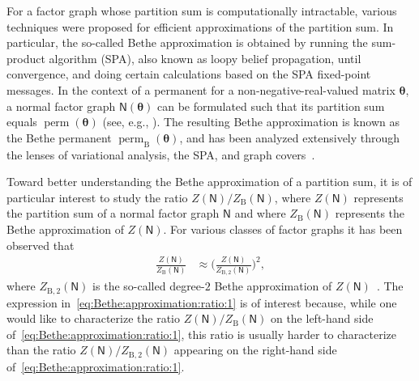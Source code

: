 \documentclass[conference]{IEEEtran}
\theoremstyle{plain}
\theoremstyle{definition}
\newcommand{\B}{\mathrm{B}}
\newcommand{\sfn}{\mathsf{N}}
\newcommand{\perm}{\operatorname{perm}}
\newcommand{\btheta}{\boldsymbol{\theta}}
\begin{document}

For a factor graph whose partition sum is computationally intractable, various
techniques
\cite{wainwrightGraphicalModelsExponential2008,yedidiaConstructingFreeenergyApproximations2005}
were proposed for efficient approximations of the partition sum. In particular,
the so-called Bethe approximation is obtained by running the sum-product
algorithm (SPA), also known as loopy belief propagation, until convergence, and
doing certain calculations based on the SPA fixed-point messages. In the
context of a permanent for a non-negative-real-valued matrix $\btheta$, a
normal factor graph $\sfn(\btheta)$ can be formulated such that its partition
sum equals $\perm(\btheta)$ (see, e.g.,
\cite{vontobelBethePermanentNonnegative2013}). The resulting Bethe
approximation is known as the Bethe permanent $\perm_\B(\btheta)$, and has been
analyzed extensively through the lenses of variational analysis, the SPA, and
graph
covers~\cite{vontobelBethePermanentNonnegative2013,vontobelCountingGraphCovers2013,
ngDoublecoverbasedAnalysisBethe2022,huangDegreeMBetheSinkhorn2024,vontobelUnderstandingRatioPartition2025}.


Toward better understanding the Bethe approximation of a partition sum, it is
of particular interest to study the ratio $Z(\sfn) / Z_\B(\sfn)$, where
$Z(\sfn)$ represents the partition sum of a normal factor graph $\sfn$ and
where $Z_\B(\sfn)$ represents the Bethe approximation of $Z(\sfn)$. For various
classes of factor graphs it has been observed
that~\cite{vontobelUnderstandingRatioPartition2025}
\begin{align}
 \frac{Z(\sfn)}{Z_\B(\sfn)}
  & \approx
 \biggl( \frac{Z(\sfn)}{Z_{\B,2}(\sfn)} \biggr)^{\!\! 2},
 \label{eq:Bethe:approximation:ratio:1}
\end{align}
where $Z_{\B,2}(\sfn)$ is the so-called degree-$2$ Bethe approximation of
$Z(\sfn)$~\cite{vontobelCountingGraphCovers2013}. The expression
in~\eqref{eq:Bethe:approximation:ratio:1} is of interest because, while one
would like to characterize the ratio $Z(\sfn) / Z_\B(\sfn)$ on the left-hand
side of~\eqref{eq:Bethe:approximation:ratio:1}, this ratio is usually harder
to characterize than the ratio $Z(\sfn) / Z_{\B,2}(\sfn)$ appearing on the
right-hand side of~\eqref{eq:Bethe:approximation:ratio:1}.

\end{document}
